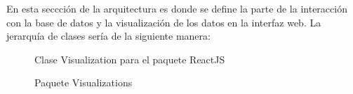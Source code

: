 En esta seccción de la arquitectura es donde se define la parte de la interacción con la base de datos y la visualización de los datos en la interfaz web. La jerarquía de clases sería de la siguiente manera: \\

\begin{figure}[H]
  \caption{Clase Visualization para el paquete ReactJS}
\end{figure}

\begin{figure}[H]
  \caption{Paquete Visualizations}
\end{figure}


